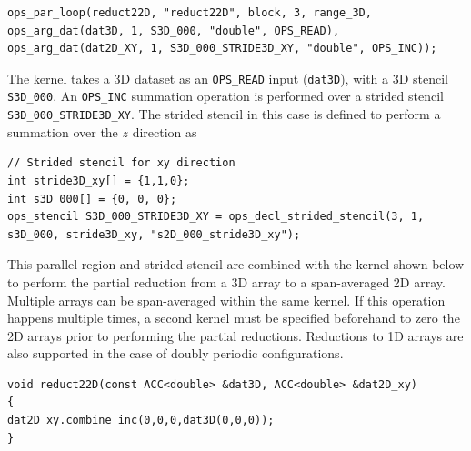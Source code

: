 \documentclass[11pt]{article}
\begin{document}
\begin{lstlisting}
ops_par_loop(reduct22D, "reduct22D", block, 3, range_3D,
ops_arg_dat(dat3D, 1, S3D_000, "double", OPS_READ),
ops_arg_dat(dat2D_XY, 1, S3D_000_STRIDE3D_XY, "double", OPS_INC));
\end{lstlisting}
The kernel takes a 3D dataset as an \verb|OPS_READ| input (\verb|dat3D|), with a 3D stencil \verb|S3D_000|. An \verb|OPS_INC| summation operation is performed over a strided stencil \verb|S3D_000_STRIDE3D_XY|. The strided stencil in this case is defined to perform a summation over the $z$ direction as 
\begin{lstlisting}
// Strided stencil for xy direction
int stride3D_xy[] = {1,1,0};
int s3D_000[] = {0, 0, 0};
ops_stencil S3D_000_STRIDE3D_XY = ops_decl_strided_stencil(3, 1, s3D_000, stride3D_xy, "s2D_000_stride3D_xy");
\end{lstlisting}
This parallel region and strided stencil are combined with the kernel shown below to perform the partial reduction from a 3D array to a span-averaged 2D array. Multiple arrays can be span-averaged within the same kernel. If this operation happens multiple times, a second kernel must be specified beforehand to zero the 2D arrays prior to performing the partial reductions. Reductions to 1D arrays are also supported in the case of doubly periodic configurations.
\begin{lstlisting}
void reduct22D(const ACC<double> &dat3D, ACC<double> &dat2D_xy)
{
dat2D_xy.combine_inc(0,0,0,dat3D(0,0,0));
}
\end{lstlisting}

\newpage
\end{document}
